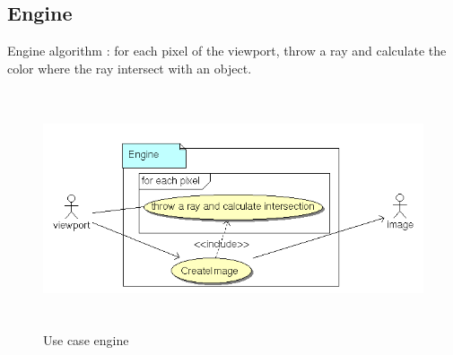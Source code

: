   \clearpage
  \subsection{Engine}

Engine algorithm : for each pixel of the viewport, throw a ray and calculate the color where the ray intersect with an object.

\begin{figure}[ht]
  \centering
  \includegraphics[height=7cm]{img/uc_render.png}
  \caption{Use case engine}
  \label{img_uc_engine}
\end{figure}


